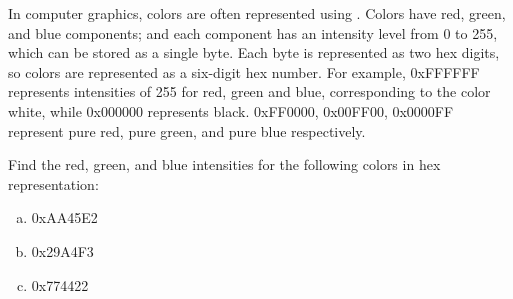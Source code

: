 \begin{exercise}\label{exercise:bases:computerGraphics}
In computer graphics, colors are often represented using . Colors have red, green, and blue components; and each component has an intensity level from 0 to 255, which can be stored as a single byte. Each byte is represented as two hex digits, so colors are represented as a six-digit hex number.  For example, 0xFFFFFF represents intensities of 255 for red, green and blue, corresponding to the color white, while 0x000000 represents black.  0xFF0000, 0x00FF00, 0x0000FF represent pure red, pure green, and pure blue respectively.

Find the red, green, and blue intensities for the following colors in hex representation:
\begin{enumerate}[(a)]
\item 0xAA45E2
\item 0x29A4F3
\item 0x774422
\end{enumerate}
\end{exercise}